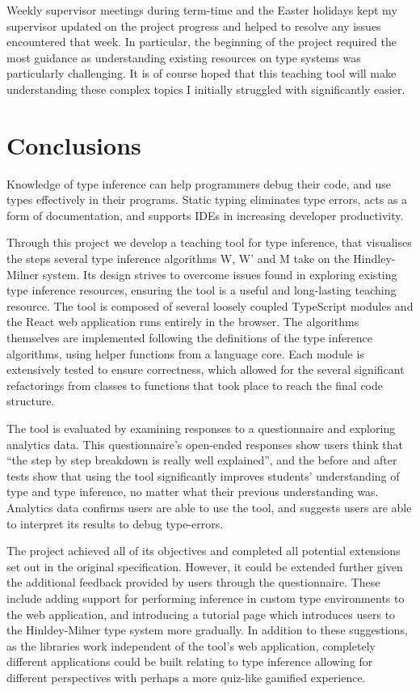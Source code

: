\documentclass[a4paper,fleqn,oneside,12pt]{report}
\begin{document}
Weekly supervisor meetings during term-time and the Easter holidays kept my supervisor updated on the project progress and helped to resolve any issues encountered that week. In particular, the beginning of the project required the most guidance as understanding existing resources on type systems was particularly challenging. It is of course hoped that this teaching tool will make understanding these complex topics I initially struggled with significantly easier.
\chapter{Conclusions}\label{id:h.90axtam6qk9n}
Knowledge of type inference can help programmers debug their code, and use types effectively in their programs. Static typing eliminates type errors, acts as a form of documentation, and supports IDEs in increasing developer productivity.

Through this project we develop a teaching tool for type inference, that visualises the steps several type inference algorithms W, W’ and M take on the Hindley-Milner system. Its design strives to overcome issues found in exploring existing type inference resources, ensuring the tool is a useful and long-lasting teaching resource. The tool is composed of several loosely coupled TypeScript modules and the React web application runs entirely in the browser. The algorithms themselves are implemented following the definitions of the type inference algorithms, using helper functions from a language core. Each module is extensively tested to ensure correctness, which allowed for the several significant refactorings from classes to functions that took place to reach the final code structure.

The tool is evaluated by examining responses to a questionnaire and exploring analytics data. This questionnaire’s open-ended responses show users think that “the step by step breakdown is really well explained”, and the before and after tests show that using the tool significantly improves students' understanding of type and type inference, no matter what their previous understanding was. Analytics data confirms users are able to use the tool, and suggests users are able to interpret its results to debug type-errors.

The project achieved all of its objectives and completed all potential extensions set out in the original specification. However, it could be extended further given the additional feedback provided by users through the questionnaire. These include adding support for performing inference in custom type environments to the web application, and introducing a tutorial page which introduces users to the Hinldey-Milner type system more gradually. In addition to these suggestions, as the libraries work independent of the tool’s web application, completely different applications could be built relating to type inference allowing for different perspectives with perhaps a more quiz-like gamified experience.
\end{document}
